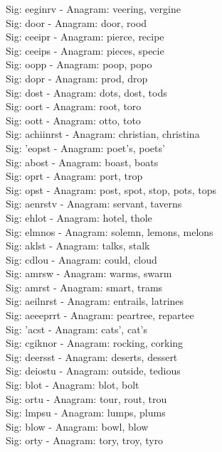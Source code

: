 Sig: {eeginrv} - Anagram: veering, vergine \\
Sig: {door} - Anagram: door, rood \\
Sig: {ceeipr} - Anagram: pierce, recipe \\
Sig: {ceeips} - Anagram: pieces, specie \\
Sig: {oopp} - Anagram: poop, popo \\
Sig: {dopr} - Anagram: prod, drop \\
Sig: {dost} - Anagram: dots, dost, tods \\
Sig: {oort} - Anagram: root, toro \\
Sig: {oott} - Anagram: otto, toto \\
Sig: {achiinrst} - Anagram: christian, christina \\
Sig: {'eopst} - Anagram: poet's, poets' \\
Sig: {abost} - Anagram: boast, boats \\
Sig: {oprt} - Anagram: port, trop \\
Sig: {opst} - Anagram: post, spot, stop, pots, tops \\
Sig: {aenrstv} - Anagram: servant, taverns \\
Sig: {ehlot} - Anagram: hotel, thole \\
Sig: {elmnos} - Anagram: solemn, lemons, melons \\
Sig: {aklst} - Anagram: talks, stalk \\
Sig: {cdlou} - Anagram: could, cloud \\
Sig: {amrsw} - Anagram: warms, swarm \\
Sig: {amrst} - Anagram: smart, trams \\
Sig: {aeilnrst} - Anagram: entrails, latrines \\
Sig: {aeeeprrt} - Anagram: peartree, repartee \\
Sig: {'acst} - Anagram: cats', cat's \\
Sig: {cgiknor} - Anagram: rocking, corking \\
Sig: {deersst} - Anagram: deserts, dessert \\
Sig: {deiostu} - Anagram: outside, tedious \\
Sig: {blot} - Anagram: blot, bolt \\
Sig: {ortu} - Anagram: tour, rout, trou \\
Sig: {lmpsu} - Anagram: lumps, plums \\
Sig: {blow} - Anagram: bowl, blow \\
Sig: {orty} - Anagram: tory, troy, tyro \\
